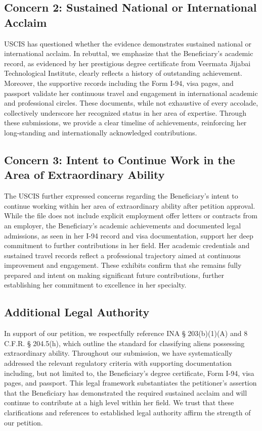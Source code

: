 \subsection*{Concern 2: Sustained National or International Acclaim}

USCIS has questioned whether the evidence demonstrates sustained national or international acclaim. In rebuttal, we emphasize that the Beneficiary’s academic record, as evidenced by her prestigious degree certificate from Veermata Jijabai Technological Institute, clearly reflects a history of outstanding achievement. Moreover, the supportive records including the Form I-94, visa pages, and passport validate her continuous travel and engagement in international academic and professional circles. These documents, while not exhaustive of every accolade, collectively underscore her recognized status in her area of expertise. Through these submissions, we provide a clear timeline of achievements, reinforcing her long-standing and internationally acknowledged contributions.

\subsection*{Concern 3: Intent to Continue Work in the Area of Extraordinary Ability}

The USCIS further expressed concerns regarding the Beneficiary’s intent to continue working within her area of extraordinary ability after petition approval. While the file does not include explicit employment offer letters or contracts from an employer, the Beneficiary’s academic achievements and documented legal admissions, as seen in her I-94 record and visa documentation, support her deep commitment to further contributions in her field. Her academic credentials and sustained travel records reflect a professional trajectory aimed at continuous improvement and engagement. These exhibits confirm that she remains fully prepared and intent on making significant future contributions, further establishing her commitment to excellence in her specialty.

\subsection*{Additional Legal Authority}

In support of our petition, we respectfully reference INA § 203(b)(1)(A) and 8 C.F.R. § 204.5(h), which outline the standard for classifying aliens possessing extraordinary ability. Throughout our submission, we have systematically addressed the relevant regulatory criteria with supporting documentation including, but not limited to, the Beneficiary’s degree certificate, Form I-94, visa pages, and passport. This legal framework substantiates the petitioner’s assertion that the Beneficiary has demonstrated the required sustained acclaim and will continue to contribute at a high level within her field. We trust that these clarifications and references to established legal authority affirm the strength of our petition.

